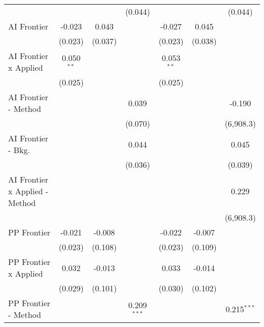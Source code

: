 \begin{tabular}{lcccccc}
                                  &                &                & (0.044)        &                &                & (0.044)\\   
   AI Frontier                    & -0.023         & 0.043          &                & -0.027         & 0.045          &   \\   
                                  & (0.023)        & (0.037)        &                & (0.023)        & (0.038)        &   \\   
   AI Frontier x Applied          & 0.050$^{**}$   &                &                & 0.053$^{**}$   &                &   \\   
                                  & (0.025)        &                &                & (0.025)        &                &   \\   
   AI Frontier - Method           &                &                & 0.039          &                &                & -0.190\\   
                                  &                &                & (0.070)        &                &                & (6,908.3)\\   
   AI Frontier - Bkg.             &                &                & 0.044          &                &                & 0.045\\   
                                  &                &                & (0.036)        &                &                & (0.039)\\   
   AI Frontier x Applied - Method &                &                &                &                &                & 0.229\\   
                                  &                &                &                &                &                & (6,908.3)\\   
   PP Frontier                    & -0.021         & -0.008         &                & -0.022         & -0.007         &   \\   
                                  & (0.023)        & (0.108)        &                & (0.023)        & (0.109)        &   \\   
   PP Frontier x Applied          & 0.032          & -0.013         &                & 0.033          & -0.014         &   \\   
                                  & (0.029)        & (0.101)        &                & (0.030)        & (0.102)        &   \\   
   PP Frontier - Method           &                &                & 0.209$^{***}$  &                &                & 0.215$^{***}$\\   

\end{tabular}
